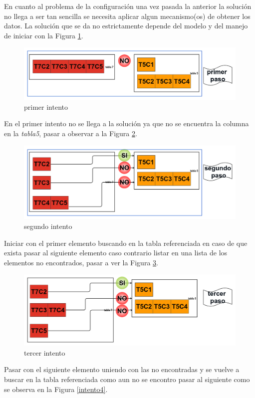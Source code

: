 En cuanto al problema de la configuraci\'on una vez pasada la anterior la soluci\'on no llega a ser tan sencilla se necesita aplicar algun mecanismo(os) de obtener los datos. La soluci\'on que se da no estrictamente depende del modelo y del manejo de iniciar con la Figura \ref{intento1}.
\begin{figure}[H]
\centering
\includegraphics[scale=0.35]{images/paso1.png}
\caption{primer intento}\label{intento1}
\end{figure}
En el primer intento no se llega a la soluci\'on ya que no se encuentra la columna en la \textit{tabla5}, pasar a observar a la Figura \ref{intento2}.
\begin{figure}[H]
\centering
\includegraphics[scale=0.35]{images/paso2.png}
\caption{segundo intento}\label{intento2}
\end{figure}
Iniciar con el primer elemento buscando en la tabla referenciada en caso de que exista pasar al siguiente elemento caso contrario listar en una lista de los elementos no encontrados, pasar a ver la Figura \ref{intento3}. 
\begin{figure}[H]
\centering
\includegraphics[scale=0.35]{images/paso3.png}
\caption{tercer intento}\label{intento3}
\end{figure}
Pasar con el siguiente elemento uniendo con las no encontradas y se vuelve a buscar en la tabla referenciada como aun no se encontro pasar al siguiente como se observa en la Figura \ref{intento4}.
